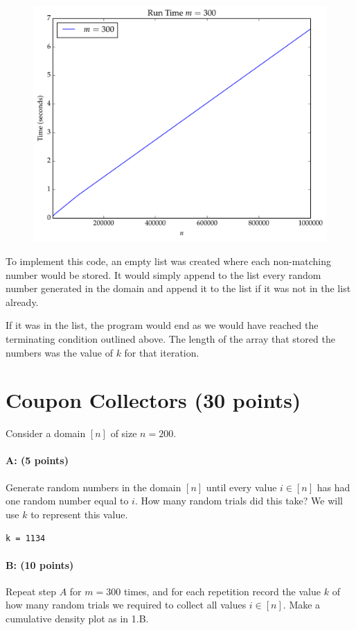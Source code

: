 \documentclass[11pt]{article}
\begin{document}
\begin{figure}[H]
\centering
\includegraphics[width=.73\textwidth]{prob1_runtime-m300.pdf}
\end{figure} 

To implement this code, an empty list was created where each non-matching number would be stored. It would simply append to the list every random number generated in the domain and append it to the list if it was not in the list already.

If it was in the list, the program would end as we would have reached the terminating condition outlined above. The length of the array that stored the numbers was the value of $k$ for that iteration. 

\section{Coupon Collectors (30 points)}

Consider a domain $[n]$ of size $n = 200$.  

\paragraph{A: (5 points)}
Generate random numbers in the domain $[n]$ until every value $i \in [n]$ has had one random number equal to $i$.
How many random trials did this take?  
We will use $k$ to represent this value.  

\verb~k = 1134~

\paragraph{B: (10 points)}
Repeat step $A$ for $m=300$ times, and for each repetition record the value $k$ of how many random trials we required to collect all values $i \in [n]$.  
Make a cumulative density plot as in 1.B.  
\end{document}
